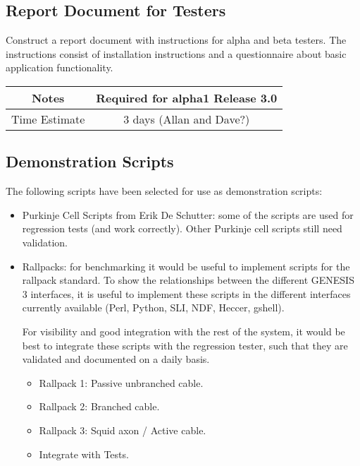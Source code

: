 \documentclass[12pt]{article}
\begin{document}
\subsection{Report Document for Testers}

Construct a report document with instructions for alpha and beta
testers.  The instructions consist of installation instructions and a
questionnaire about basic application functionality.

{
  \vspace{5mm}
  \centering
  \begin{tabular}{|c|c|}
    \hline
    Notes
    & Required for alpha1 Release 3.0 \\
    \hline
    Time Estimate
    & 3 days (Allan and Dave?) \\
    \hline
  \end{tabular}
}


\subsection{Demonstration Scripts}

The following scripts have been selected for use as demonstration
scripts:

\begin{itemize}
\item Purkinje Cell Scripts from Erik De Schutter: some of the scripts
  are used for regression tests (and work correctly).  Other Purkinje
  cell scripts still need validation.
\item Rallpacks: for benchmarking it would be useful to implement
  scripts for the rallpack standard.  To show the relationships
  between the different GENESIS 3 interfaces, it is useful to
  implement these scripts in the different interfaces currently
  available (Perl, Python, SLI, NDF, Heccer, gshell).

  For visibility and good integration with the rest of the system, it
  would be best to integrate these scripts with the regression tester,
  such that they are validated and documented on a daily basis.
  \begin{itemize}
  \item Rallpack 1: Passive unbranched cable.
  \item Rallpack 2: Branched cable.
  \item Rallpack 3: Squid axon / Active cable.
  \item Integrate with Tests.
  \end{itemize}
\end{itemize}
\end{document}
